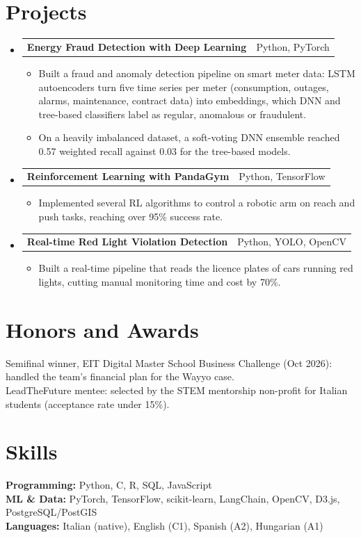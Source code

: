 \documentclass[a4paper,11pt]{article}
\makeatletter
\newcommand{\resumeItem}[1]{\item\small{{#1 \vspace{-2pt}}}}
\newcommand{\resumeProjectHeading}[2]{
    \item
    \begin{tabular*}{0.97\textwidth}{l@{\extracolsep{\fill}}r}
      \small#1 & #2 \\
    \end{tabular*}\vspace{-7pt}
}
\newcommand{\resumeSubHeadingListStart}{\begin{itemize}[leftmargin=0.15in, label={}, itemsep=0pt, topsep=1pt]}
\newcommand{\resumeSubHeadingListEnd}{\end{itemize}}
\newcommand{\resumeItemListStart}{\begin{itemize}[leftmargin=0.2in, topsep=1pt, itemsep=0pt, parsep=0pt]}
\newcommand{\resumeItemListEnd}{\end{itemize}\vspace{-4pt}}
\makeatother
\begin{document}
\section{Projects}
  \resumeSubHeadingListStart
    \resumeProjectHeading
      {\textbf{Energy Fraud Detection with Deep Learning}}{Python, PyTorch}
      \resumeItemListStart
        \resumeItem{Built a fraud and anomaly detection pipeline on smart meter data: LSTM autoencoders turn five time series per meter (consumption, outages, alarms, maintenance, contract data) into embeddings, which DNN and tree-based classifiers label as regular, anomalous or fraudulent.}
        \resumeItem{On a heavily imbalanced dataset, a soft-voting DNN ensemble reached 0.57 weighted recall against 0.03 for the tree-based models.}
      \resumeItemListEnd
    \resumeProjectHeading
      {\textbf{Reinforcement Learning with PandaGym}}{Python, TensorFlow}
      \resumeItemListStart
        \resumeItem{Implemented several RL algorithms to control a robotic arm on reach and push tasks, reaching over 95\% success rate.}
      \resumeItemListEnd
    \resumeProjectHeading
      {\textbf{Real-time Red Light Violation Detection}}{Python, YOLO, OpenCV}
      \resumeItemListStart
        \resumeItem{Built a real-time pipeline that reads the licence plates of cars running red lights, cutting manual monitoring time and cost by 70\%.}
      \resumeItemListEnd
  \resumeSubHeadingListEnd

\section{Honors and Awards}
 \begin{itemize}[leftmargin=0.15in, label={}]
    \small{\item{
     Semifinal winner, EIT Digital Master School Business Challenge (Oct 2026): handled the team's financial plan for the Wayyo case. \\[2pt]
     LeadTheFuture mentee: selected by the STEM mentorship non-profit for Italian students (acceptance rate under 15\%).
    }}
 \end{itemize}

\section{Skills}
 \begin{itemize}[leftmargin=0.15in, label={}]
    \small{\item{
     \textbf{Programming:} Python, C, R, SQL, JavaScript \\[2pt]
     \textbf{ML \& Data:} PyTorch, TensorFlow, scikit-learn, LangChain, OpenCV, D3.js, PostgreSQL/PostGIS \\[2pt]
     \textbf{Languages:} Italian (native), English (C1), Spanish (A2), Hungarian (A1)
    }}
 \end{itemize}
\end{document}
